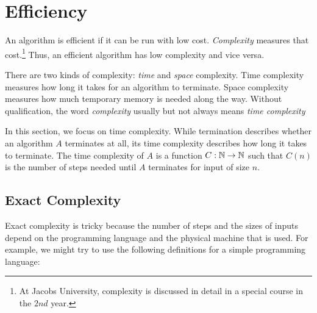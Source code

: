 \section{Efficiency}\label{sec:ad:complex}

An algorithm is efficient if it can be run with low cost.
\emph{Complexity} measures that cost.\footnote{At Jacobs University, complexity is discussed in detail in a special course in the $2nd$ year.}
Thus, an efficient algorithm has low complexity and vice versa.

There are two kinds of complexity: \emph{time} and \emph{space} complexity.
Time complexity measures how long it takes for an algorithm to terminate.
Space complexity measures how much temporary memory is needed along the way.
Without qualification, the word \emph{complexity} usually but not always means \emph{time complexity}

In this section, we focus on time complexity.
While termination describes whether an algorithm $A$ terminates at all, its time complexity describes how long it takes to terminate.
The time complexity of $A$ is a function $C:\mathbb{N}\to\mathbb{N}$ such that $C(n)$ is the number of steps needed until $A$ terminates for input of size $n$.

\subsection{Exact Complexity}\label{sec:ad:complex:general}

Exact complexity is tricky because the number of steps and the sizes of inputs depend on the programming language and the physical machine that is used.
For example, we might try to use the following definitions for a simple programming language:

